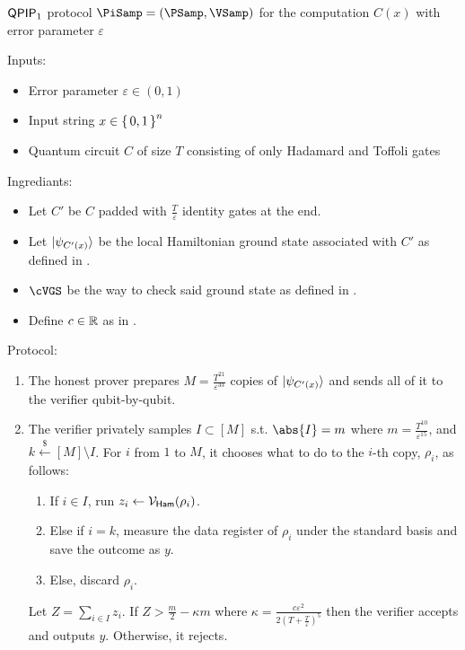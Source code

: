\begin{protocol}{$\operatorname{\mathsf{QPIP}}_1$ protocol $\PiSamp=(\PSamp, \VSamp)$ for the computation $C(x)$ with error parameter $\varepsilon$}
	\label{ProtoQPIP1}

	Inputs:
	\begin{itemize}
		\item Error parameter $\varepsilon\in(0, 1)$
		\item Input string $x\in\set{0, 1}^n$
		\item Quantum circuit $C$ of size $T$ consisting of only Hadamard and Toffoli gates 
	\end{itemize}

	Ingrediants:
	\begin{itemize}
		\item Let $C'$ be $C$ padded with $\frac{T}{\varepsilon}$ identity gates at the end.
		\item Let $\ket{\psi_{C'(x)}}$ be the local Hamiltonian ground state associated with $C'$ as defined in . 
		\item $\cVGS$ be the way to check said ground state as defined in . 
		\item Define $c\in\mathbb{R}$ as in . 
	\end{itemize}

	Protocol:
	\begin{enumerate}
		\item The honest prover prepares $M=\frac{T^{21}}{\varepsilon^{33}}$ copies of $\ket{\psi_{C'(x)}}$ and sends all of it to the verifier qubit-by-qubit.
		\item The verifier privately samples $I\subset[M]$ s.t. $\abs{I}=m$ where $m=\frac{T^{10}}{\varepsilon^{15}}$, and $k\xleftarrow{\$}[M]\setminus I$.
			For $i$ from $1$ to $M$, it chooses what to do to the $i$-th copy, $\rho_i$, as follows:
		\begin{enumerate}
			\item If $i\in I$, run $z_i\leftarrow\mathcal{V}_{\mathsf{Ham}}(\rho_i)$.
			\item Else if $i=k$, measure the data register  of $\rho_i$ under the standard basis and save the outcome as $y$.
			\item Else, discard $\rho_i$.
		\end{enumerate}
			Let $Z=\sum_{i\in I} z_i$. If $Z>\frac{m}{2}-\kappa m$ where $\kappa=\frac{c\varepsilon^2}{2\left(T+\frac{T}{\varepsilon}\right)^5}$ then the verifier accepts and outputs $y$. Otherwise, it rejects.
	\end{enumerate}
\end{protocol}

